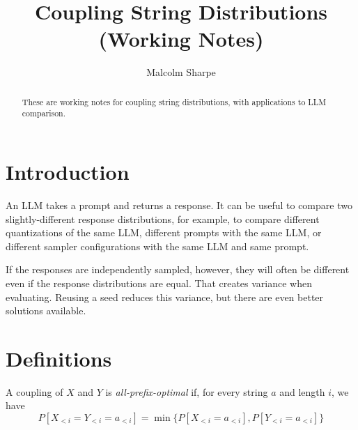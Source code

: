 \documentclass{article}
\title{Coupling String Distributions (Working Notes)}
\author{Malcolm Sharpe}
\begin{document}
\maketitle

\begin{abstract}
These are working notes for coupling string distributions,
with applications to LLM comparison.
\end{abstract}

\section{Introduction}
An LLM takes a prompt and returns a response.
It can be useful to compare two slightly-different response distributions,
for example, to compare different quantizations of the same LLM,
different prompts with the same LLM,
or different sampler configurations with the same LLM and same prompt.

If the responses are independently sampled, however,
they will often be different even if the response distributions are equal.
That creates variance when evaluating.
Reusing a seed reduces this variance,
but there are even better solutions available.

\section{Definitions}

A coupling of $X$ and $Y$ is \textit{all-prefix-optimal} if,
for every string $a$ and length $i$, we have
\[
P[X_{<i} = Y_{<i} = a_{<i}] = \min \{ P[X_{<i} = a_{<i}], P[Y_{<i} = a_{<i}] \}
\]
\end{document}

